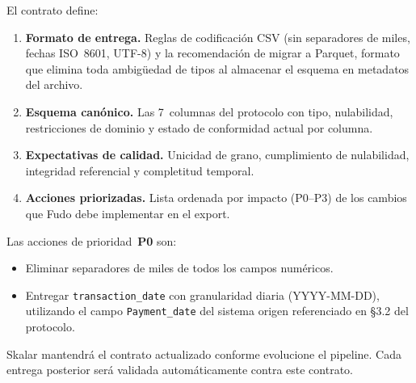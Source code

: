 \documentclass[11pt,a4paper]{article}
\newcommand{\field}[1]{\texttt{#1}}
\begin{document}
El contrato define:

\begin{enumerate}[leftmargin=2em]
    \item \textbf{Formato de entrega.} Reglas de codificaci\'on CSV
      (sin separadores de miles, fechas ISO~8601, UTF-8) y la
      recomendaci\'on de migrar a Parquet, formato que elimina toda
      ambig\"uedad de tipos al almacenar el esquema en metadatos del
      archivo.
    \item \textbf{Esquema can\'onico.} Las 7~columnas del protocolo con
      tipo, nulabilidad, restricciones de dominio y estado de
      conformidad actual por columna.
    \item \textbf{Expectativas de calidad.} Unicidad de grano,
      cumplimiento de nulabilidad, integridad referencial y
      completitud temporal.
    \item \textbf{Acciones priorizadas.} Lista ordenada por impacto
      (P0--P3) de los cambios que Fudo debe implementar en el export.
\end{enumerate}

Las acciones de prioridad~\textbf{P0} son:

\begin{itemize}[leftmargin=2em]
    \item Eliminar separadores de miles de todos los campos num\'ericos.
    \item Entregar \field{transaction\_date} con granularidad diaria
      (YYYY-MM-DD), utilizando el campo \field{Payment\_date} del
      sistema origen referenciado en \S3.2 del protocolo.
\end{itemize}

Skalar mantendr\'a el contrato actualizado conforme evolucione el
pipeline. Cada entrega posterior ser\'a validada autom\'aticamente
contra este contrato.
\end{document}
